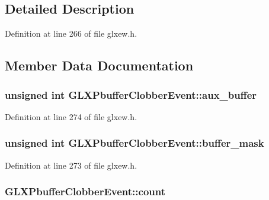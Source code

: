 \subsection{Detailed Description}


Definition at line 266 of file glxew.\+h.



\subsection{Member Data Documentation}
\hypertarget{struct_g_l_x_pbuffer_clobber_event_a13193b6e7e3e52b15f754fe91403b7ec}{}
\subsubsection[{aux\+\_\+buffer}]{\setlength{\rightskip}{0pt plus 5cm}unsigned {\bf int} G\+L\+X\+Pbuffer\+Clobber\+Event\+::aux\+\_\+buffer}\label{struct_g_l_x_pbuffer_clobber_event_a13193b6e7e3e52b15f754fe91403b7ec}


Definition at line 274 of file glxew.\+h.

\hypertarget{struct_g_l_x_pbuffer_clobber_event_aff4c23d00f6dad98427f8d32a5f10580}{}
\subsubsection[{buffer\+\_\+mask}]{\setlength{\rightskip}{0pt plus 5cm}unsigned {\bf int} G\+L\+X\+Pbuffer\+Clobber\+Event\+::buffer\+\_\+mask}\label{struct_g_l_x_pbuffer_clobber_event_aff4c23d00f6dad98427f8d32a5f10580}


Definition at line 273 of file glxew.\+h.

\hypertarget{struct_g_l_x_pbuffer_clobber_event_a61e9f6b31738464dca67f909fcacd298}{}
\subsubsection[{count}]{ G\+L\+X\+Pbuffer\+Clobber\+Event\+::count}\label{struct_g_l_x_pbuffer_clobber_event_a61e9f6b31738464dca67f909fcacd298}


